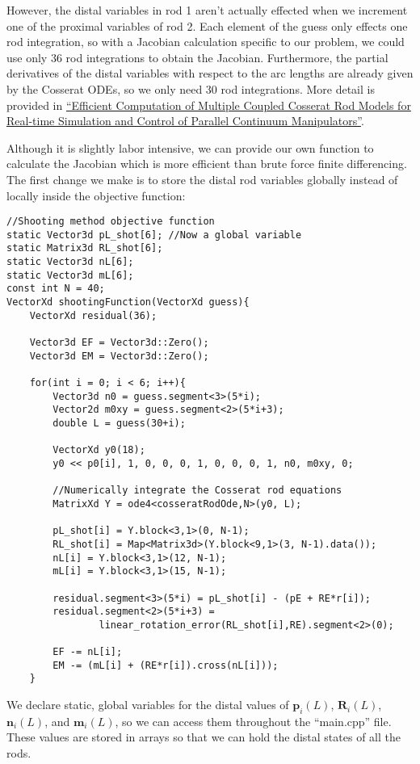\documentclass[12pt]{article}
\begin{document}
However, the distal variables in rod 1 aren't actually effected when we increment one of the proximal variables of rod 2. Each element of the guess only effects one rod integration, so with a Jacobian calculation specific to our problem, we could use only 36 rod integrations to obtain the Jacobian. Furthermore, the partial derivatives of the distal variables with respect to the arc lengths are already given by the Cosserat ODEs, so we only need 30 rod integrations. More detail is provided in \href{https://ieeexplore.ieee.org/document/7139904}{``Efficient Computation of Multiple Coupled Cosserat Rod Models for Real-time Simulation and Control of Parallel Continuum Manipulators''}.

\newpage
Although it is slightly labor intensive, we can provide our own function to calculate the Jacobian which is more efficient than brute force finite differencing. The first change we make is to store the distal rod variables globally instead of locally inside the objective function:
\begin{lstlisting}
//Shooting method objective function
static Vector3d pL_shot[6]; //Now a global variable
static Matrix3d RL_shot[6];
static Vector3d nL[6];
static Vector3d mL[6];
const int N = 40;
VectorXd shootingFunction(VectorXd guess){
    VectorXd residual(36);

    Vector3d EF = Vector3d::Zero();
    Vector3d EM = Vector3d::Zero();

    for(int i = 0; i < 6; i++){
        Vector3d n0 = guess.segment<3>(5*i);
        Vector2d m0xy = guess.segment<2>(5*i+3);
        double L = guess(30+i);

        VectorXd y0(18);
        y0 << p0[i], 1, 0, 0, 0, 1, 0, 0, 0, 1, n0, m0xy, 0;

        //Numerically integrate the Cosserat rod equations
        MatrixXd Y = ode4<cosseratRodOde,N>(y0, L);

        pL_shot[i] = Y.block<3,1>(0, N-1);
        RL_shot[i] = Map<Matrix3d>(Y.block<9,1>(3, N-1).data());
        nL[i] = Y.block<3,1>(12, N-1);
        mL[i] = Y.block<3,1>(15, N-1);

        residual.segment<3>(5*i) = pL_shot[i] - (pE + RE*r[i]);
        residual.segment<2>(5*i+3) =
                linear_rotation_error(RL_shot[i],RE).segment<2>(0);

        EF -= nL[i];
        EM -= (mL[i] + (RE*r[i]).cross(nL[i]));
    }
\end{lstlisting}
We declare static, global variables for the distal values of $\boldsymbol{p}_i(L)$, $\boldsymbol{R}_i(L)$, $\boldsymbol{n}_i(L)$, and $\boldsymbol{m}_i(L)$, so we can access them throughout the ``main.cpp'' file. These values are stored in arrays so that we can hold the distal states of all the rods.
\end{document}
